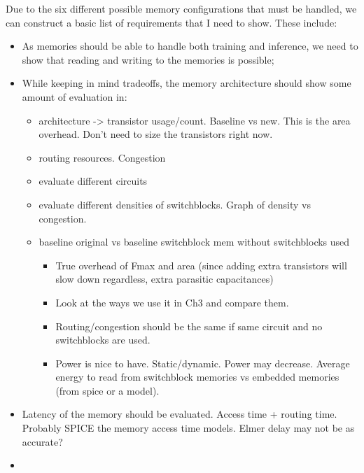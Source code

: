 Due to the six different possible memory configurations that must be handled, we can construct a basic list of requirements that I need to show. These include:
\begin{itemize}
    \item As memories should be able to handle both training and inference, we need to show that reading and writing to the memories is possible;
    \item While keeping in mind tradeoffs, the memory architecture should show some amount of evaluation in:
    \begin{itemize}
        \item architecture -> transistor usage/count. Baseline vs new. This is the area overhead. Don't need to size the transistors right now.
        \item routing resources. Congestion
        \item evaluate different circuits
        \item evaluate different densities of switchblocks. Graph of density vs congestion.
        \item baseline original vs baseline switchblock mem without switchblocks used
        \begin{itemize}
            \item True overhead of Fmax and area (since adding extra transistors will slow down regardless, extra parasitic capacitances)
            \item Look at the ways we use it in Ch3 and compare them.
            \item Routing/congestion should be the same if same circuit and no switchblocks are used.
            \item Power is nice to have. Static/dynamic. Power may decrease. Average energy to read from switchblock memories vs embedded memories (from spice or a model).
        \end{itemize}
    \end{itemize}
    \item Latency of the memory should be evaluated. Access time + routing time. Probably SPICE the memory access time models. Elmer delay may not be as accurate? 
    \item 
\end{itemize}
